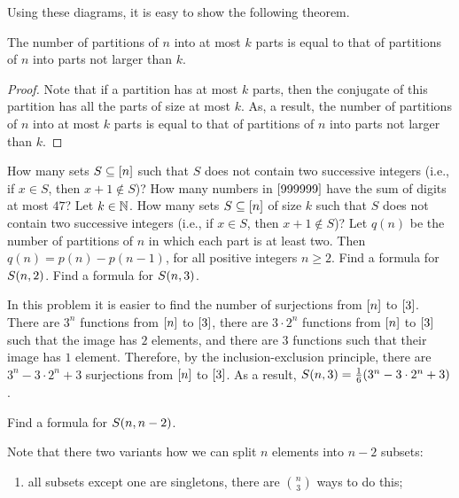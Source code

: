 Using these diagrams, it is easy to show the following theorem.
\begin{theorem}
  The number of partitions of $n$ into at most $k$ parts is equal to that of
  partitions of $n$ into parts not larger than $k$.
\end{theorem}
\begin{proof}
  Note that if a partition has at most $k$ parts, then the conjugate of this
  partition has all the parts of size at most $k$. As, a result, the number
  of partitions of $n$ into at most $k$ parts is equal to that of
  partitions of $n$ into parts not larger than $k$.
\end{proof}

\begin{chapterendexercises}
  \exercise How many sets $S \subseteq {[{n}]}$ such that $S$ does not contain
    two successive integers (i.e., if $x \in S$, then $x + 1 \not\in S$)?
  \exercise How many numbers in ${[{999999}]}$ have the sum of digits at most
    $47$?
  \exercise Let $k \in {\mathbb{N}}$. How many sets $S \subseteq {[{n}]}$ of size $k$
    such that $S$ does not contain two successive integers (i.e., if $x \in S$,
    then $x + 1 \not\in S$)?
  \exercise
    Let $q(n)$ be the number of partitions of $n$ in which each part is at least
    two. Then $q(n) = p(n) - p(n - 1)$, for all positive integers $n \ge 2$.
  \exercise[recommended] Find a formula for $S({n}, {2})$.
  \exercise Find a formula for $S({n}, {3})$.
    \begin{solution}
      In this problem it is easier to find the number of surjections from 
      ${[{n}]}$ to ${[{3}]}$. There are $3^n$ functions from ${[{n}]}$ to
      ${[{3}]}$, there are $3 \cdot 2^n$ functions from ${[{n}]}$ to
      ${[{3}]}$ such that the image has $2$ elements, and there are $3$
      functions such that their image has $1$ element. Therefore, by the
      inclusion-exclusion principle, there are $3^n - 3 \cdot 2^n + 3$
      surjections from ${[{n}]}$ to ${[{3}]}$. As a result, 
      $S({n}, {3}) = \frac{1}{6}(3^n - 3 \cdot 2^n + 3)$.
    \end{solution}
  \exercise Find a formula for $S({n}, {n - 2})$.
    \begin{solution}
      Note that there two variants how we can split $n$ elements into $n - 2$ subsets: 
      \begin{enumerate}
        \item all subsets except one are singletons, there are $\binom{n}{3}$
          ways to do this;

\end{enumerate}
\end{solution}
\end{chapterendexercises}
